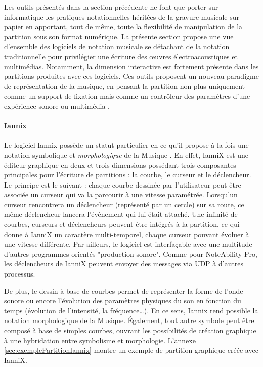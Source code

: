 Les outils présentés dans la section précédente ne font que porter sur informatique les pratiques notationnelles héritées de la gravure musicale sur papier en apportant, tout de même, toute la flexibilité de manipulation de la partition sous son format numérique.
La présente section propose une vue d'ensemble des logiciels de notation musicale se détachant de la notation traditionnelle pour privilégier une écriture des œuvres électroacoustiques et multimédias.
Notamment, la dimension interactive est fortement présente dans les partitions produites avec ces logiciels. Ces outils proposent un nouveau paradigme de représentation de la musique, en pensant la partition non plus uniquement  comme un support de fixation mais comme un \og contrôleur des paramètres d'une expérience sonore ou multimédia \fg \cite{gottfried2017}. 

\paragraph{Iannix} Le logiciel Iannix possède un statut particulier en ce qu'il propose à la fois une notation symbolique et \textit{morphologique} de la Musique \cite{coduys2003}. En effet, IanniX est une éditeur graphique en deux et trois dimensions possédant trois composantes principales pour l'écriture de partitions : la courbe, le curseur et le déclencheur. Le principe est le suivant : chaque courbe dessinée par l'utilisateur peut être associée un curseur qui va la parcourir à une vitesse paramétrée. Lorsqu'un curseur rencontrera un déclencheur (représenté par un cercle) sur sa route, ce même déclencheur lancera l'évènement qui lui était attaché.
Une infinité de courbes, curseurs et déclencheurs peuvent être intégrés à la partition, ce qui donne à IanniX un caractère multi-temporel, chaque curseur pouvant évoluer à une vitesse différente.
Par ailleurs, le logiciel est interfaçable avec une multitude d'autres programmes orientés "production sonore". Comme pour NoteAbility Pro, les déclencheurs de IanniX peuvent envoyer des messages via UDP à d'autres processus.

De plus, le dessin à base de courbes permet de représenter la forme de l'onde sonore ou encore l'évolution  des paramètres physiques du son en fonction du temps (évolution de l'intensité, la fréquence…). En ce sens, Iannix rend possible la notation morphologique de la Musique.
Également, tout autre symbole peut être composé à base de simples courbes, ouvrant les possibilités de création graphique à une hybridation entre symbolisme et morphologie.
L'annexe \ref{sec:exemplePartitionIannix} montre un exemple de partition graphique créée avec IanniX.

